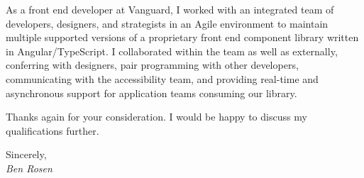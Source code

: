 \documentclass{letter}
\begin{document}
As a front end developer at Vanguard, I worked with an integrated team of
developers, designers, and strategists in an Agile environment to maintain
multiple supported versions of a proprietary front end component library written
in Angular/TypeScript. I collaborated within the team as well as externally,
conferring with designers, pair programming with other developers, communicating
with the accessibility team, and providing real-time and asynchronous support
for application teams consuming our library.

Thanks again for your consideration. I would be happy to discuss my
qualifications further.

Sincerely, \\
\emph{Ben Rosen}
\end{document}
